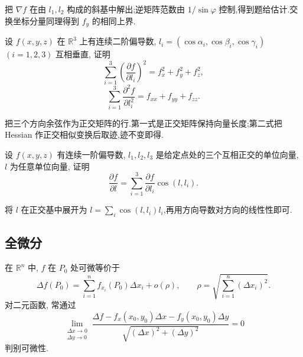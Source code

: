 \begin{solution}
    把 $\nabla f$ 在由 $l_1,l_2$ 构成的斜基中解出;逆矩阵范数由 $1/\sin\varphi$ 控制,得到题给估计.交换坐标分量同理得到 $f_y$ 的相同上界.
\end{solution}

\begin{example}
    设 $f(x,y,z)$ 在 $\mathbb{R}^3$ 上有连续二阶偏导数, $l_i=(\cos\alpha_i,\cos\beta_i,\cos\gamma_i)$ $(i=1,2,3)$ 互相垂直, 证明
    \[
        \displaystyle\sum\limits_{i=1}^3\left(\dfrac{\partial f}{\partial l_i}\right)^2
        =f_x^2+f_y^2+f_z^2,
    \]
    \[
        \displaystyle\sum\limits_{i=1}^3\dfrac{\partial^2f}{\partial l_i^2}
        =f_{xx}+f_{yy}+f_{zz}.
    \]
\end{example}
\exampleblank

\begin{solution}
    把三个方向余弦作为正交矩阵的行.第一式是正交矩阵保持向量长度;第二式把 Hessian 作正交相似变换后取迹,迹不变即得.
\end{solution}

\begin{example}[\markstar]
    设 $f(x,y,z)$ 有连续一阶偏导数, $l_1,l_2,l_3$ 是给定点处的三个互相正交的单位向量, $l$ 为任意单位向量, 证明
    \[
        \dfrac{\partial f}{\partial l}
        =\sum\limits_{i=1}^3\dfrac{\partial f}{\partial l_i}\cos(l,l_i).
    \]
\end{example}
\exampleblank

\begin{solution}
    将 $l$ 在正交基中展开为 $l=\displaystyle\sum_i\cos(l,l_i)l_i$,再用方向导数对方向的线性性即可.
\end{solution}



\subsection{全微分}

在 $\mathbb{R}^n$ 中, $f$ 在 $P_0$ 处可微等价于
\[
    \Delta f(P_0)=\sum\limits_{i=1}^n f_{x_i}(P_0)\Delta x_i+o(\rho),
    \qquad
    \rho=\sqrt{\sum\limits_{i=1}^n(\Delta x_i)^2}.
\]
对二元函数, 常通过
\[
    \displaystyle\lim\limits_{\substack{\Delta x\to0\\\Delta y\to0}}
    \dfrac{\Delta f-f_x(x_0,y_0)\Delta x-f_y(x_0,y_0)\Delta y}
    {\sqrt{(\Delta x)^2+(\Delta y)^2}}=0
\]
判别可微性.

